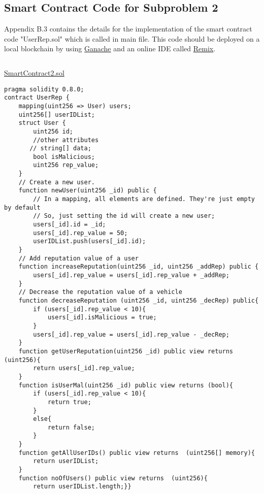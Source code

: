 \newpage

\subsection{Smart Contract Code for Subproblem 2}
Appendix B.3 contains the details for the implementation of the smart contract code "UserRep.sol" which is called in main file. This code should be deployed on a local blockchain by using \href{https://www.trufflesuite.com/ganache}{Ganache} and an online IDE called \href{http://remix.ethereum.org/}{Remix}.\par

\begin{linenumbers}
\begin{lstlisting}

\end{lstlisting}
\hypertarget{milp_code}{}
\hyperlink{milp_text}{SmartContract2.sol}
\begin{lstlisting}
pragma solidity 0.8.0;
contract UserRep {
    mapping(uint256 => User) users;
    uint256[] userIDList;
    struct User {
        uint256 id;
        //other attributes
       // string[] data;
        bool isMalicious;
        uint256 rep_value;
    }
    // Create a new user.
    function newUser(uint256 _id) public {
        // In a mapping, all elements are defined. They're just empty by default
        // So, just setting the id will create a new user;
        users[_id].id = _id;
        users[_id].rep_value = 50;
        userIDList.push(users[_id].id);
    }
    // Add reputation value of a user
    function increaseReputation(uint256 _id, uint256 _addRep) public {
        users[_id].rep_value = users[_id].rep_value + _addRep; 
    }
    // Decrease the reputation value of a vehicle
    function decreaseReputation (uint256 _id, uint256 _decRep) public{
        if (users[_id].rep_value < 10){
            users[_id].isMalicious = true;
        }
        users[_id].rep_value = users[_id].rep_value - _decRep;
    }
    function getUserReputation(uint256 _id) public view returns (uint256){
        return users[_id].rep_value;
    }
    function isUserMal(uint256 _id) public view returns (bool){
        if (users[_id].rep_value < 10){
            return true;
        }
        else{
            return false;
        }
    }
    function getAllUserIDs() public view returns  (uint256[] memory){
        return userIDList;
    }
    function noOfUsers() public view returns  (uint256){
        return userIDList.length;}}
\end{lstlisting}
\end{linenumbers} 